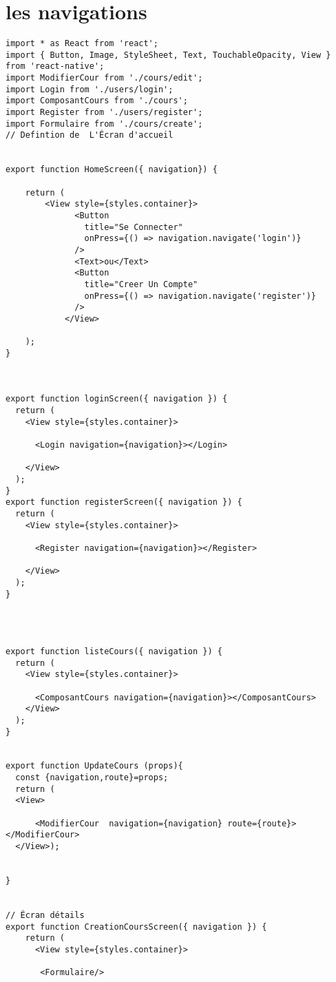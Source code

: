\documentclass[10pt,a4paper]{article}
\begin{document}
\section{les navigations}
\begin{verbatim}
import * as React from 'react';
import { Button, Image, StyleSheet, Text, TouchableOpacity, View } from 'react-native';
import ModifierCour from './cours/edit';
import Login from './users/login';
import ComposantCours from './cours';
import Register from './users/register';
import Formulaire from './cours/create';
// Defintion de  L'Écran d'accueil


export function HomeScreen({ navigation}) {

    return (
        <View style={styles.container}>
              <Button
                title="Se Connecter"
                onPress={() => navigation.navigate('login')}
              />              
              <Text>ou</Text>
              <Button
                title="Creer Un Compte"
                onPress={() => navigation.navigate('register')}
              />
            </View>

    );
}



export function loginScreen({ navigation }) {
  return (
    <View style={styles.container}>
     
      <Login navigation={navigation}></Login>
      
    </View>
  );
}
export function registerScreen({ navigation }) {
  return (
    <View style={styles.container}>
     
      <Register navigation={navigation}></Register>
      
    </View>
  );
}




export function listeCours({ navigation }) {
  return (
    <View style={styles.container}>
     
      <ComposantCours navigation={navigation}></ComposantCours>
    </View>
  );
}


export function UpdateCours (props){
  const {navigation,route}=props;
  return ( 
  <View>
     
      <ModifierCour  navigation={navigation} route={route}></ModifierCour>
  </View>);

 
}


// Écran détails
export function CreationCoursScreen({ navigation }) {
    return (
      <View style={styles.container}>
       
       <Formulaire/> 
            

\end{verbatim}
\end{document}
